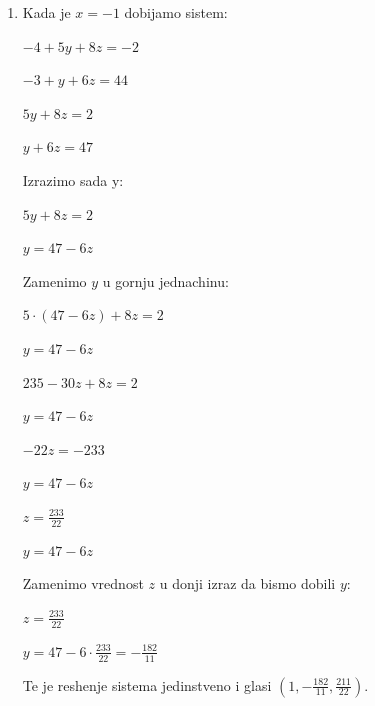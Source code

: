 \documentclass[a4paper,12pt]{article}
\begin{document}
\begin{enumerate}[1.]
\begin{enumerate}[1)]
\item Kada je $x = -1$ dobijamo sistem:
\begin{center}
\par $-4 + 5y +8z = -2$
\par $-3 + y + 6z = 44$
\end{center}
\begin{center}
\par $5y +8z = 2$
\par $y + 6z = 47$
\end{center}
\par Izrazimo sada y:
\begin{center}
\par $5y +8z = 2$
\par $y = 47 - 6z$
\end{center}
\par Zamenimo $y$ u gornju jednachinu:
\begin{center}
\par $5 \cdot (47 - 6z) +8z = 2$
\par $y = 47 - 6z$
\end{center}
\begin{center}
\par $235-30z +8z = 2$
\par $y = 47 - 6z$
\end{center}
\begin{center}
\par $-22z=-233$
\par $y = 47 - 6z$
\end{center}
\begin{center}
\par $z = \frac{233}{22}$
\par $y = 47 - 6z$
\end{center}
\par Zamenimo vrednost $z$ u donji izraz da bismo dobili $y$:
\begin{center}
\par $z = \frac{233}{22}$
\par $y = 47 - 6 \cdot \frac{233}{22} = - \frac{182}{11}$
\end{center}
\par Te je reshenje sistema jedinstveno i glasi $(1,-\frac{182}{11}, \frac{211}{22})$.


\end{enumerate}
\end{enumerate}
\end{document}
